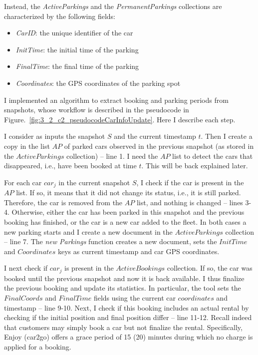 Instead, the \textit{ActiveParkings} and the \textit{PermanentParkings} collections are characterized by the following fields:
\begin{itemize}
\setlength\itemsep{0.1em}
\item \textit{CarID}: the unique identifier of the car
\item \textit{InitTime}: the initial time of the parking
\item \textit{FinalTime}:  the final time of the parking
\item \textit{Coordinates}: the GPS coordinates of the parking spot 
\end{itemize}




I implemented an algorithm to extract booking and parking periods from snapshots, whose workflow is described in the pseudocode in Figure.~\ref{fig:3_2_c2_pseudocodeCarInfoUpdate}. Here I describe each  step.

I consider as inputs the snapshot $S$ and the current timestamp $t$.
Then I create a copy in the list $AP$ of parked cars observed in the previous snapshot (as stored in the $ActiveParkings$ collection) -- line 1. I need the $AP$ list to detect the cars that disappeared, i.e., have been booked at time $t$. This will be back explained later.

For each car $car_j$ in the current snapshot $S$, I check if the car is present in the $AP$ list. 
If so, it means that it did not change its status, i.e., it is still parked. Therefore, the car is removed from the $AP$ list, and nothing is changed -- lines 3-4.
Otherwise, either the car has been parked in this snapshot and the previous booking has finished, or the car is a new car added to the fleet. In both cases a new parking starts and I create a new document in the $ActiveParkings$ collection -- line 7. The \textit{new Parkings} function creates a new document, sets the $InitTime$ and $Coordinates$ keys as current timestamp and car GPS coordinates.

I next check if $car_j$ is present in the $ActiveBookings$ collection. If so, the car was booked until the previous snapshot and now it is back available. I thus finalize the previous booking and update its statistics. In particular, the tool sets the $FinalCoords$ and $FinalTime$ fields using the current car $coordinates$ and timestamp -- line 9-10. Next, I check if this booking includes an actual rental by checking if the initial position and final position differ -- line 11-12. Recall indeed that customers may simply book a car but not finalize the rental. Specifically, Enjoy (car2go) offers a grace period of 15 (20) minutes during which no charge is applied for a booking.


